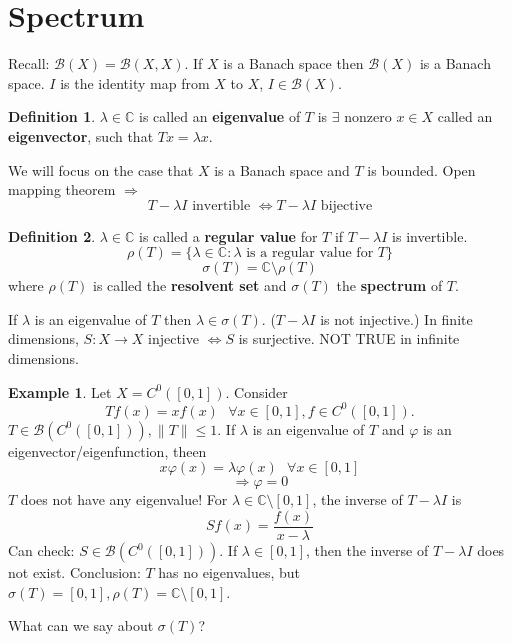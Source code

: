 \documentclass{article}
\theoremstyle{definition}
\newtheorem{ex}{Example}
\newtheorem{dfn}{Definition}
\newcommand{\sfa}{\text{  } \forall}
\begin{document}
\section{Spectrum}

Recall: $\mathcal{B}(X) = \mathcal{B}(X, X)$.
If $X$ is a Banach space then $\mathcal{B}(X)$ is a Banach space.
$I$ is the identity map from $X$ to $X$, $I \in \mathcal{B}(X)$.

\begin{dfn}
	$\lambda \in \mathbb{C}$ is called an \textbf{eigenvalue} of $T$ is $\exists$ nonzero $x \in X$ called an \textbf{eigenvector}, such that $T x = \lambda x$.
\end{dfn}	

We will focus on the case that $X$ is a Banach space and $T$ is bounded.
Open mapping theorem $\Rightarrow$
\[
	T - \lambda I \text{ invertible } \Leftrightarrow T - \lambda I \text{ bijective}
\]

\begin{dfn}
	$\lambda \in \mathbb{C}$ is called a \textbf{regular value} for $T$ if $T - \lambda I$ is invertible.
	\[
		\rho(T) = \{ \lambda \in \mathbb{C}: \lambda \text{ is a regular value for } T\}
	\]
	\[
		\sigma(T) = \mathbb{C} \setminus \rho(T)
	\]
	where $\rho(T)$ is called the \textbf{resolvent set} and $\sigma(T)$ the \textbf{spectrum} of $T$.
\end{dfn}

If $\lambda$ is an eigenvalue of $T$ then $\lambda \in \sigma(T)$. 
($T - \lambda I$ is not injective.)
In finite dimensions, $S:X \to X$ injective $\Leftrightarrow S$ is surjective.
NOT TRUE in infinite dimensions.

\begin{ex}
	Let $X = C^0([0, 1])$.
	Consider 
	\[
		T f(x) = x f(x) \sfa x \in [0, 1], f \in C^0([0, 1]).
	\]
	$T \in \mathcal{B}(C^0([0, 1])), \|T\| \leq 1$.
	If $\lambda$ is an eigenvalue of $T$ and $\varphi$ is an eigenvector/eigenfunction, theen
	\[
		x \varphi(x) = \lambda \varphi(x) \sfa x \in [0, 1]
	\]
	\[
		\Rightarrow \varphi = 0
	\]
	$T$ does not have any eigenvalue!
	For $\lambda \in \mathbb{C} \setminus [0, 1]$, the inverse of $T - \lambda I$ is 
	\[
		S f(x) = \frac{f(x)}{x - \lambda}
	\]
	Can check: $S \in \mathcal{B}(C^0([0, 1]))$.
	If $\lambda \in [0, 1]$, then the inverse of $T - \lambda I$ does not exist.
	Conclusion: $T$ has no eigenvalues, but $\sigma(T) = [0, 1], \rho(T) = \mathbb{C} \setminus [0, 1]$.
\end{ex}

What can we say about $\sigma (T)$?
\end{document}
